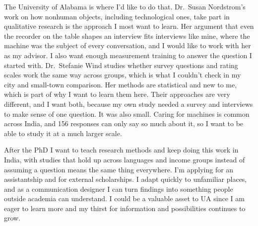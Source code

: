 \documentclass[11pt,letterpaper]{article}
\begin{document}
The University of Alabama is where I'd like to do that. Dr.~Susan Nordstrom's work on how nonhuman objects, including technological ones, take part in qualitative research is the approach I most want to learn. Her argument that even the recorder on the table shapes an interview fits interviews like mine, where the machine was the subject of every conversation, and I would like to work with her as my advisor. I also want enough measurement training to answer the question I started with. Dr.~Stefanie Wind studies whether survey questions and rating scales work the same way across groups, which is what I couldn't check in my city and small-town comparison. Her methods are statistical and new to me, which is part of why I want to learn them here. Their approaches are very different, and I want both, because my own study needed a survey and interviews to make sense of one question. It was also small. Caring for machines is common across India, and 156 responses can only say so much about it, so I want to be able to study it at a much larger scale.

After the PhD I want to teach research methods and keep doing this work in India, with studies that hold up across languages and income groups instead of assuming a question means the same thing everywhere. I'm applying for an assistantship and for external scholarships. I adapt quickly to unfamiliar places, and as a communication designer I can turn findings into something people outside academia can understand. I could be a valuable asset to UA since I am eager to learn more and my thirst for information and possibilities continues to grow.
\end{document}

